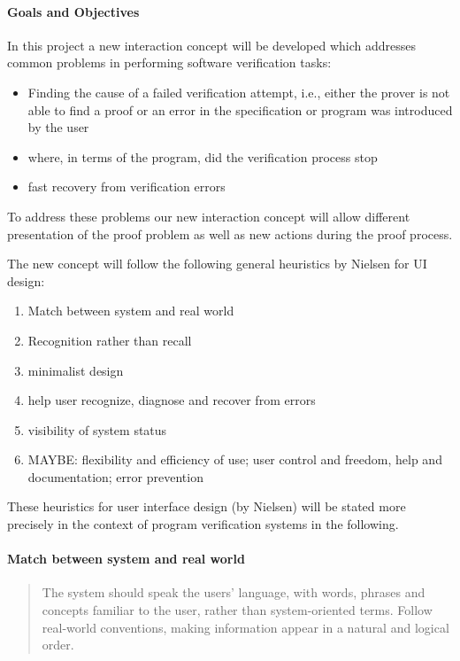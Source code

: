 \documentclass{article}
\begin{document}
\paragraph{Goals and Objectives}
In this project a new interaction concept will be developed which addresses 
common problems in performing software verification tasks:

\begin{itemize}
 \item Finding the cause of a failed verification attempt, i.e., either the 
prover is not able to find a proof or an error in the specification or program 
was introduced by the user
\item where, in terms of the program, did the verification process stop
\item fast recovery from verification errors 
\end{itemize}

To address these problems our new interaction concept will allow different 
presentation of the proof problem as well as new actions during the proof 
process.

The new concept will follow the following general heuristics by Nielsen for UI 
design:
\begin{enumerate}
 \item Match between system and real world
 \item Recognition rather than recall
 \item minimalist design
 \item help user recognize, diagnose and recover from errors
 \item visibility of system status
 \item MAYBE: flexibility and efficiency of use; user control and freedom, help 
and documentation; error prevention
\end{enumerate}

These heuristics for user interface design (by Nielsen) will be stated more 
precisely in the context of program verification systems in the following.

\paragraph{Match between system and real world}
\begin{quote}
 The system should speak the users' language, with words, phrases and concepts 
familiar to the user, rather than system-oriented terms. Follow real-world 
conventions, making information appear in a natural and logical order.
\end{quote}
\end{document}
